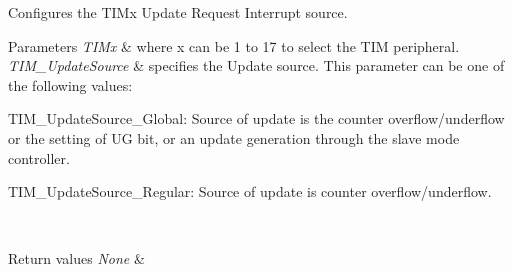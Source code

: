 Configures the T\+I\+Mx Update Request Interrupt source. 


\begin{DoxyParams}{Parameters}
{\em T\+I\+Mx} & where x can be 1 to 17 to select the T\+IM peripheral. \\
\hline
{\em T\+I\+M\+\_\+\+Update\+Source} & specifies the Update source. This parameter can be one of the following values\+: \begin{DoxyItemize}
\item T\+I\+M\+\_\+\+Update\+Source\+\_\+\+Global\+: Source of update is the counter overflow/underflow or the setting of UG bit, or an update generation through the slave mode controller. \item T\+I\+M\+\_\+\+Update\+Source\+\_\+\+Regular\+: Source of update is counter overflow/underflow. \end{DoxyItemize}
\\
\hline
\end{DoxyParams}

\begin{DoxyRetVals}{Return values}
{\em None} & \\
\hline
\end{DoxyRetVals}
